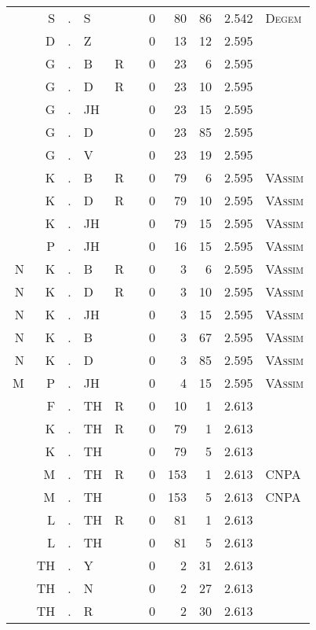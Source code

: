 \begin{longtable}{r@{ } r@{ } c@{ } l@{ } l@{ } l@{ } r r r r l }
  & S & . & S &   &   & 0 & 80 & 86 & 2.542 & \textsc{Degem} \\
  & D & . & Z &   &   & 0 & 13 & 12 & 2.595 &  \\
  & G & . & B & R &   & 0 & 23 & 6 & 2.595 &  \\
  & G & . & D & R &   & 0 & 23 & 10 & 2.595 &  \\
  & G & . & JH &   &   & 0 & 23 & 15 & 2.595 &  \\
  & G & . & D &   &   & 0 & 23 & 85 & 2.595 &  \\
  & G & . & V &   &   & 0 & 23 & 19 & 2.595 &  \\
  & K & . & B & R &   & 0 & 79 & 6 & 2.595 & \textsc{VAssim} \\
  & K & . & D & R &   & 0 & 79 & 10 & 2.595 & \textsc{VAssim} \\
  & K & . & JH &   &   & 0 & 79 & 15 & 2.595 & \textsc{VAssim} \\
  & P & . & JH &   &   & 0 & 16 & 15 & 2.595 & \textsc{VAssim} \\
N & K & . & B & R &   & 0 & 3 & 6 & 2.595 & \textsc{VAssim} \\
N & K & . & D & R &   & 0 & 3 & 10 & 2.595 & \textsc{VAssim} \\
N & K & . & JH &   &   & 0 & 3 & 15 & 2.595 & \textsc{VAssim} \\
N & K & . & B &   &   & 0 & 3 & 67 & 2.595 & \textsc{VAssim} \\
N & K & . & D &   &   & 0 & 3 & 85 & 2.595 & \textsc{VAssim} \\
M & P & . & JH &   &   & 0 & 4 & 15 & 2.595 & \textsc{VAssim} \\
  & F & . & TH & R &   & 0 & 10 & 1 & 2.613 &  \\
  & K & . & TH & R &   & 0 & 79 & 1 & 2.613 &  \\
  & K & . & TH &   &   & 0 & 79 & 5 & 2.613 &  \\
  & M & . & TH & R &   & 0 & 153 & 1 & 2.613 & \textsc{CNPA} \\
  & M & . & TH &   &   & 0 & 153 & 5 & 2.613 & \textsc{CNPA} \\
  & L & . & TH & R &   & 0 & 81 & 1 & 2.613 &  \\
  & L & . & TH &   &   & 0 & 81 & 5 & 2.613 &  \\
  & TH & . & Y &   &   & 0 & 2 & 31 & 2.613 &  \\
  & TH & . & N &   &   & 0 & 2 & 27 & 2.613 &  \\
  & TH & . & R &   &   & 0 & 2 & 30 & 2.613 &  \\

\end{longtable}
